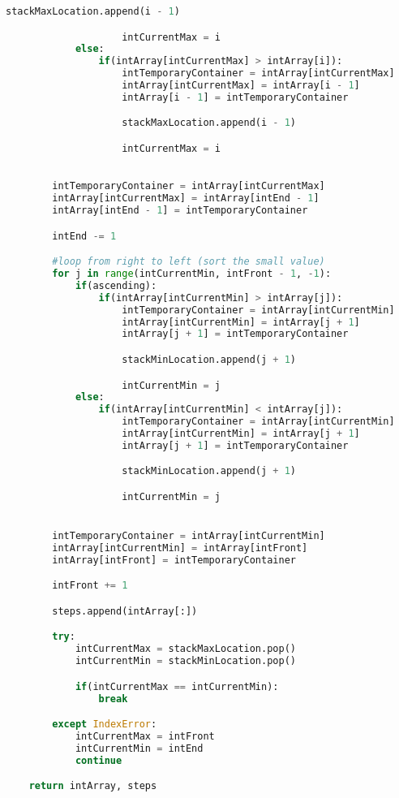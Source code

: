 \documentclass{article}
\begin{document}
\begin{lstlisting}[language=Python]
                    stackMaxLocation.append(i - 1)

                    intCurrentMax = i
            else:
                if(intArray[intCurrentMax] > intArray[i]):
                    intTemporaryContainer = intArray[intCurrentMax]
                    intArray[intCurrentMax] = intArray[i - 1]
                    intArray[i - 1] = intTemporaryContainer

                    stackMaxLocation.append(i - 1)

                    intCurrentMax = i

        
        intTemporaryContainer = intArray[intCurrentMax]
        intArray[intCurrentMax] = intArray[intEnd - 1]
        intArray[intEnd - 1] = intTemporaryContainer

        intEnd -= 1

        #loop from right to left (sort the small value)
        for j in range(intCurrentMin, intFront - 1, -1):
            if(ascending):
                if(intArray[intCurrentMin] > intArray[j]):
                    intTemporaryContainer = intArray[intCurrentMin]
                    intArray[intCurrentMin] = intArray[j + 1]
                    intArray[j + 1] = intTemporaryContainer

                    stackMinLocation.append(j + 1)

                    intCurrentMin = j
            else:
                if(intArray[intCurrentMin] < intArray[j]):
                    intTemporaryContainer = intArray[intCurrentMin]
                    intArray[intCurrentMin] = intArray[j + 1]
                    intArray[j + 1] = intTemporaryContainer

                    stackMinLocation.append(j + 1)

                    intCurrentMin = j


        intTemporaryContainer = intArray[intCurrentMin]
        intArray[intCurrentMin] = intArray[intFront]
        intArray[intFront] = intTemporaryContainer

        intFront += 1

        steps.append(intArray[:])

        try:
            intCurrentMax = stackMaxLocation.pop()
            intCurrentMin = stackMinLocation.pop()

            if(intCurrentMax == intCurrentMin):
                break

        except IndexError:
            intCurrentMax = intFront
            intCurrentMin = intEnd
            continue

    return intArray, steps
\end{lstlisting}
\end{document}
